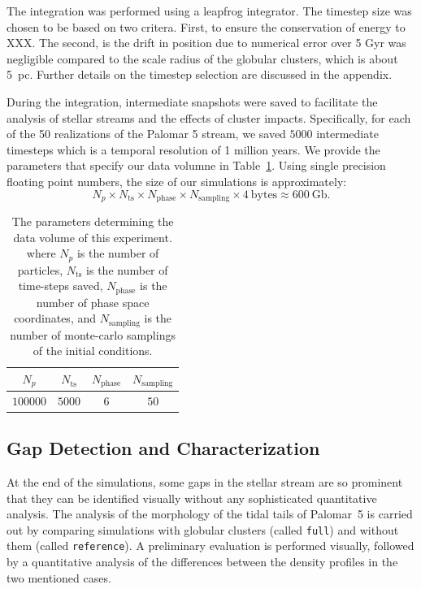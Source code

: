 \documentclass{aa}
\begin{document}
    The integration was performed using a leapfrog integrator. The timestep size was chosen to be based on two critera. First, to ensure the conservation of energy to XXX. The second, is the drift in position due to numerical error over 5 Gyr was negligible compared to the scale radius of the globular clusters, which is about 5~pc. Further details on the timestep selection are discussed in the appendix.

    During the integration, intermediate snapshots were saved to facilitate the analysis of stellar streams and the effects of cluster impacts. Specifically, for each of the 50 realizations of the Palomar 5 stream, we saved $5000$ intermediate timesteps which is a temporal resolution of 1 million years. We provide the parameters that specify our data volumne in Table~\ref{tab:data_volume}. Using single precision floating point numbers, the size of our simulations is approximately:
    \begin{equation} \label{eq:data_volume_estimate}
      N_p \times N_{\textrm{ts}}\times N_{\textrm{phase}}\times N_{\textrm{sampling}} \times 4~\textrm{bytes}\approx 600~\textrm{Gb}.
    \end{equation}

    \begin{table}[h]
      \centering
      \begin{tabular}{|c|c|c|c|}
          \hline
          $N_p$ & $N_{\textrm{ts}}$ & $N_{\textrm{phase}}$ & $N_{\textrm{sampling}}$ \\
          \hline
          $100000$ & $5000$ & $6$ & $50$ \\
          \hline
      \end{tabular}
      \caption{The parameters determining the data volume of this experiment. where $N_p$  is the number of particles, $N_{\textrm{ts}}$ is the number of time-steps saved, $N_{\textrm{phase}}$ is the number of phase space coordinates, and $N_{\textrm{sampling}}$ is the number of monte-carlo samplings of the initial conditions.}
      \label{tab:data_volume}
  \end{table}





  \subsection{Gap Detection and Characterization} \label{sec:gap_methods}

    At the end of the simulations, some gaps in the stellar stream are so prominent that they can be identified visually without any sophisticated quantitative analysis. The analysis of the morphology of the tidal tails of Palomar~5 is carried out by comparing simulations with globular clusters (called \texttt{full}) and without them (called \texttt{reference}). A preliminary evaluation is performed visually, followed by a quantitative analysis of the differences between the density profiles in the two mentioned cases. 
\end{document}
